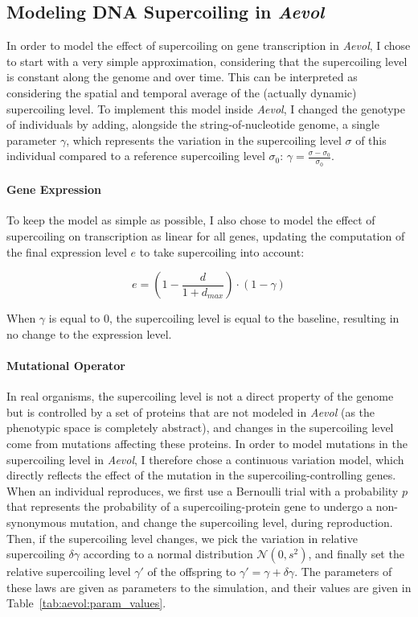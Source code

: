 \subsection{Modeling DNA Supercoiling in \emph{Aevol}}

In order to model the effect of supercoiling on gene transcription in \emph{Aevol}, I chose to start with a very simple approximation, considering that the supercoiling level is constant along the genome and over time.
This can be interpreted as considering the spatial and temporal average of the (actually dynamic) supercoiling level.
To implement this model inside \emph{Aevol}, I changed the genotype of individuals by adding, alongside the string-of-nucleotide genome, a single parameter $\gamma$, which represents the variation in the supercoiling level $\sigma$ of this individual compared to a reference supercoiling level $\sigma_0$: $\gamma = \frac{\sigma-\sigma_0}{\sigma_0}$.

\paragraph{Gene Expression}
To keep the model as simple as possible, I also chose to model the effect of supercoiling on transcription as linear for all genes, updating the computation of the final expression level $e$ to take supercoiling into account:

\begin{equation}
e = (1 - \frac{d}{1+d_{max}}) \cdot (1 - \gamma)
\label{eq:aevol:sc}
\end{equation}

When $\gamma$ is equal to 0, the supercoiling level is equal to the baseline, resulting in no change to the expression level.

\paragraph{Mutational Operator}
In real organisms, the supercoiling level is not a direct property of the genome but is controlled by a set of proteins that are not modeled in \emph{Aevol} (as the phenotypic space is completely abstract), and changes in the supercoiling level come from mutations affecting these proteins.
In order to model mutations in the supercoiling level in \emph{Aevol}, I therefore chose a continuous variation model, which directly reflects the effect of the mutation in the supercoiling-controlling genes.
When an individual reproduces, we first use a Bernoulli trial with a probability $p$ that represents the probability of a supercoiling-protein gene to undergo a non-synonymous mutation, and change the supercoiling level, during reproduction.
Then, if the supercoiling level changes, we pick the variation in relative supercoiling $\delta\gamma$ according to a normal distribution $\mathcal{N}(0, s^2)$, and finally set the relative supercoiling level $\gamma'$ of the offspring to $\gamma' = \gamma + \delta\gamma$.
The parameters of these laws are given as parameters to the simulation, and their values are given in Table~\ref{tab:aevol:param_values}.


